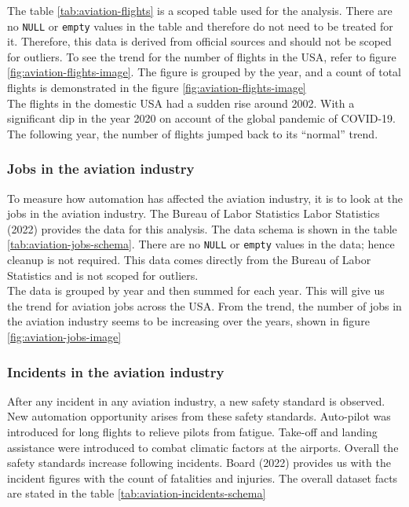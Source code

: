 \documentclass[
  man,floatsintext]{apa7}
\begin{document}
The table \ref{tab:aviation-flights} is a scoped table used for the analysis. There are no \texttt{NULL} or \texttt{empty} values in the table and therefore do not need to be treated for it. Therefore, this data is derived from official sources and should not be scoped for outliers. To see the trend for the number of flights in the USA, refer to figure \ref{fig:aviation-flights-image}. The figure is grouped by the year, and a count of total flights is demonstrated in the figure \ref{fig:aviation-flights-image}\\
The flights in the domestic USA had a sudden rise around 2002. With a significant dip in the year 2020 on account of the global pandemic of COVID-19. The following year, the number of flights jumped back to its ``normal'' trend.

\hypertarget{jobs-in-the-aviation-industry}{%
\subsubsection{Jobs in the aviation industry}\label{jobs-in-the-aviation-industry}}

To measure how automation has affected the aviation industry, it is to look at the jobs in the aviation industry. The Bureau of Labor Statistics Labor Statistics (2022) provides the data for this analysis. The data schema is shown in the table \ref{tab:aviation-jobs-schema}. There are no \texttt{NULL} or \texttt{empty} values in the data; hence cleanup is not required. This data comes directly from the Bureau of Labor Statistics and is not scoped for outliers.\\

The data is grouped by year and then summed for each year. This will give us the trend for aviation jobs across the USA. From the trend, the number of jobs in the aviation industry seems to be increasing over the years, shown in figure \ref{fig:aviation-jobs-image}\\

\hypertarget{incidents-in-the-aviation-industry}{%
\subsubsection{Incidents in the aviation industry}\label{incidents-in-the-aviation-industry}}

After any incident in any aviation industry, a new safety standard is observed. New automation opportunity arises from these safety standards. Auto-pilot was introduced for long flights to relieve pilots from fatigue. Take-off and landing assistance were introduced to combat climatic factors at the airports. Overall the safety standards increase following incidents. Board (2022) provides us with the incident figures with the count of fatalities and injuries. The overall dataset facts are stated in the table \ref{tab:aviation-incidents-schema}\\
\end{document}
